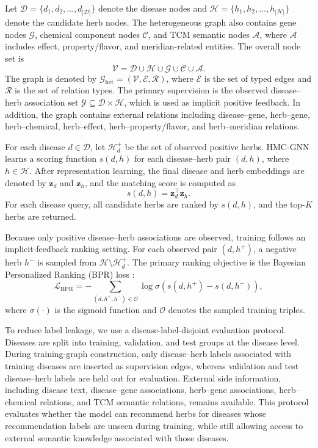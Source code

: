 \documentclass[journal,twoside,web]{ieeecolor}
\begin{document}
Let $\mathcal{D}=\{d_1,d_2,\ldots,d_{|\mathcal{D}|}\}$ denote the disease nodes and $\mathcal{H}=\{h_1,h_2,\ldots,h_{|\mathcal{H}|}\}$ denote the candidate herb nodes. The heterogeneous graph also contains gene nodes $\mathcal{G}$, chemical component nodes $\mathcal{C}$, and TCM semantic nodes $\mathcal{A}$, where $\mathcal{A}$ includes effect, property/flavor, and meridian-related entities. The overall node set is
\begin{equation}
\mathcal{V}=\mathcal{D}\cup\mathcal{H}\cup\mathcal{G}\cup\mathcal{C}\cup\mathcal{A}.
\label{eq:node_set}
\end{equation}
The graph is denoted by $\mathcal{G}_{\mathrm{het}}=(\mathcal{V},\mathcal{E},\mathcal{R})$, where $\mathcal{E}$ is the set of typed edges and $\mathcal{R}$ is the set of relation types. The primary supervision is the observed disease--herb association set $\mathcal{Y}\subseteq \mathcal{D}\times\mathcal{H}$, which is used as implicit positive feedback. In addition, the graph contains external relations including disease--gene, herb--gene, herb--chemical, herb--effect, herb--property/flavor, and herb--meridian relations.

For each disease $d\in\mathcal{D}$, let $\mathcal{H}_d^{+}$ be the set of observed positive herbs. HMC-GNN learns a scoring function $s(d,h)$ for each disease--herb pair $(d,h)$, where $h\in\mathcal{H}$. After representation learning, the final disease and herb embeddings are denoted by $\mathbf{z}_d$ and $\mathbf{z}_h$, and the matching score is computed as
\begin{equation}
s(d,h)=\mathbf{z}_d^{\top}\mathbf{z}_h .
\label{eq:score}
\end{equation}
For each disease query, all candidate herbs are ranked by $s(d,h)$, and the top-$K$ herbs are returned.

Because only positive disease--herb associations are observed, training follows an implicit-feedback ranking setting. For each observed pair $(d,h^{+})$, a negative herb $h^{-}$ is sampled from $\mathcal{H}\setminus\mathcal{H}_d^{+}$. The primary ranking objective is the Bayesian Personalized Ranking (BPR) loss \cite{ref51}:
\begin{equation}
\mathcal{L}_{\mathrm{BPR}}
=-\sum_{(d,h^{+},h^{-})\in\mathcal{O}}
\log \sigma\left(s(d,h^{+})-s(d,h^{-})\right),
\label{eq:bpr}
\end{equation}
where $\sigma(\cdot)$ is the sigmoid function and $\mathcal{O}$ denotes the sampled training triples.

To reduce label leakage, we use a disease-label-disjoint evaluation protocol. Diseases are split into training, validation, and test groups at the disease level. During training-graph construction, only disease--herb labels associated with training diseases are inserted as supervision edges, whereas validation and test disease--herb labels are held out for evaluation. External side information, including disease text, disease--gene associations, herb--gene associations, herb--chemical relations, and TCM semantic relations, remains available. This protocol evaluates whether the model can recommend herbs for diseases whose recommendation labels are unseen during training, while still allowing access to external semantic knowledge associated with those diseases.
\end{document}
